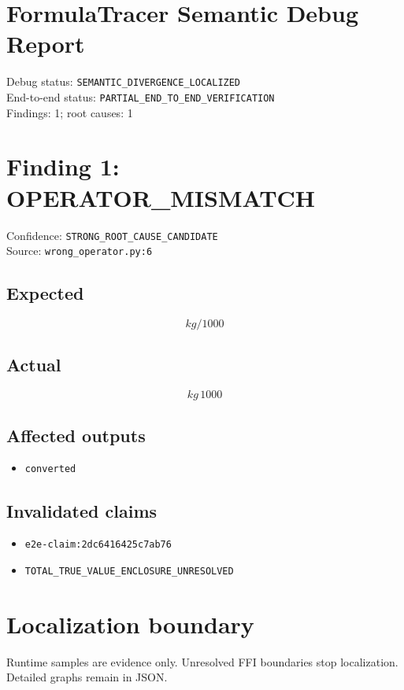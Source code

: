 \documentclass{article}
\begin{document}
\small
\section*{FormulaTracer Semantic Debug Report}
Debug status: \texttt{SEMANTIC\_DIVERGENCE\_LOCALIZED}\\
End-to-end status: \texttt{PARTIAL\_END\_TO\_END\_VERIFICATION}\\
Findings: 1; root causes: 1
\section*{Finding 1: OPERATOR\_MISMATCH}
Confidence: \texttt{STRONG\_ROOT\_CAUSE\_CANDIDATE}\\
Source: \texttt{wrong\_operator.py:6}\\
\subsection*{Expected}
\[kg / 1000\]
\subsection*{Actual}
\[kg \, 1000\]
\subsection*{Affected outputs}
\begin{itemize}
\item \texttt{converted}
\end{itemize}
\subsection*{Invalidated claims}
\begin{itemize}
\item \texttt{e2e-claim:2dc6416425c7ab76}
\item \texttt{TOTAL\_TRUE\_VALUE\_ENCLOSURE\_UNRESOLVED}
\end{itemize}
\section*{Localization boundary}
Runtime samples are evidence only. Unresolved FFI boundaries stop localization. Detailed graphs remain in JSON.
\end{document}
